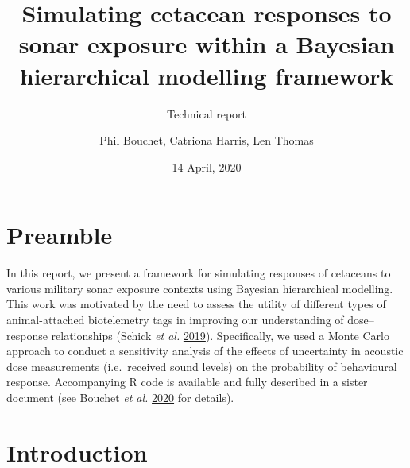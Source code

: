 \documentclass[
]{article}
\title{Simulating cetacean responses to sonar exposure within a Bayesian hierarchical modelling framework}
\subtitle{Technical report}
\author{Phil Bouchet, Catriona Harris, Len Thomas}
\date{14 April, 2020}
\begin{document}
\maketitle

{
\hypersetup{linkcolor=black}
\setcounter{tocdepth}{3}
\tableofcontents
}
\section{Preamble}

In this report, we present a framework for simulating responses of cetaceans to various military sonar exposure contexts using Bayesian hierarchical modelling. This work was motivated by the need to assess the utility of different types of animal-attached biotelemetry tags in improving our understanding of dose--response relationships (Schick \emph{et al.} \protect\hyperlink{ref-Schick2019}{2019}). Specifically, we used a Monte Carlo approach to conduct a sensitivity analysis of the effects of uncertainty in acoustic dose measurements (i.e.~received sound levels) on the probability of behavioural response. Accompanying R code is available and fully described in a sister document (see Bouchet \emph{et al.} \protect\hyperlink{ref-Bouchet2020b}{2020} for details).

\section{Introduction}
\end{document}
